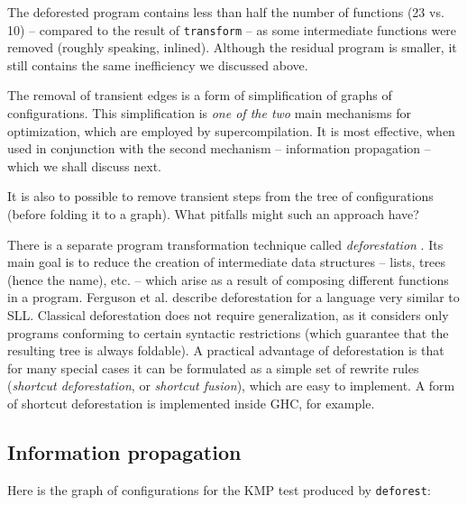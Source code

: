 The deforested program contains less than half the number of functions (23 vs. 10)
-- compared to the result of \texttt{transform} --
as some intermediate functions were removed (roughly speaking, inlined).
Although the residual program is smaller, it still contains the same inefficiency 
we discussed above.

The removal of transient edges is a form of simplification of graphs of configurations.
This simplification is \emph{one of the two} main mechanisms for optimization,
which are employed by supercompilation. 
It is most effective, when used in conjunction with the second mechanism
-- information propagation -- which we shall discuss next.

\begin{exercise}
It is also to possible to remove transient steps from the tree of configurations (before folding it to a graph).
What pitfalls might such an approach have?
\end{exercise}


There is a separate program transformation technique 
called \emph{deforestation} \cite{Wadler1988deforestation,Ferguson1988When}.
Its main goal is to reduce the creation of intermediate data structures
-- lists, trees (hence the name), etc. -- which arise as a result of
composing different functions in a program.
Ferguson et al. \cite{Ferguson1988When} describe deforestation for a language
very similar to SLL.
Classical deforestation does not require generalization, as it considers
only programs conforming to certain syntactic restrictions
(which guarantee that the resulting tree is always foldable).
A practical advantage of deforestation is that for
many special cases it can be formulated as a simple set of
rewrite rules (\emph{shortcut deforestation}, or \emph{shortcut fusion}),
which are easy to implement. 
A form of shortcut deforestation is implemented inside GHC, for example.

\subsection{Information propagation}

Here is the graph of configurations for the KMP test produced by \texttt{deforest}:\\


